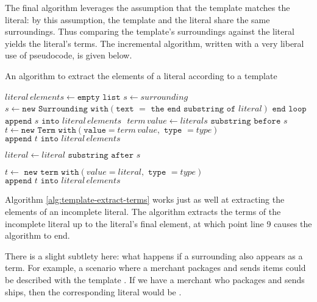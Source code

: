 \documentclass[../main.tex]{subfiles}
\begin{document}
The final algorithm leverages the assumption that the template matches the literal: by this assumption, the template and the literal share the same surroundings. Thus comparing the template's surroundings against the literal yields the literal's terms. The incremental algorithm, written with a very liberal use of pseudocode, is given below.

\begin{algorithm}
\caption{An algorithm to extract the elements of a literal according to a template}\label{alg:template-extract-terms}
\begin{algorithmic}[1]
    \State $literal \, elements \gets \texttt{empty list}$
            \State $s \gets surrounding$
            \State $s \gets \texttt{new Surrounding with}(\texttt{text } = \texttt{ the end substring of } literal)$
        \Else
            \State $\texttt{end loop}$
        \EndIf
        \State $\texttt{append } s \texttt{ into } literal \, elements$
        \State $ $
        \State $term \, value \gets literals \texttt{ substring before } s$
            \State $t \gets \texttt{new Term with}(\texttt{value} = term \, value, \texttt{ type } = type)$
            \State $\texttt{append } t \texttt{ into } literal \, elements$
        \EndIf

        \State $literal \gets literal \texttt{ substring after } s$
    \EndFor

        \State $t \gets \texttt{ new term with}(value = literal, \texttt{ type } = type)$
        \State $\texttt{append } t \texttt{ into } literal \, elements$
    \EndIf
\end{algorithmic}
\end{algorithm}
Algorithm \ref{alg:template-extract-terms} works just as well at extracting the elements of an incomplete literal. The algorithm extracts the terms of the incomplete literal up to the literal's final element, at which point line 9 causes the algorithm to end.

There is a slight subtlety here: what happens if a surrounding also appears as a term. For example, a scenario where a merchant packages and sends items could be described with the template . If we have a merchant who packages and sends ships, then the corresponding literal would be .
\end{document}
